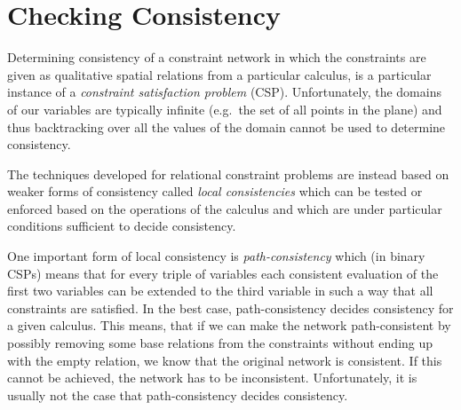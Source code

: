 \documentclass[headsepline]{scrreprt}
\theoremstyle{definition}
\newcommand{\engine}{SparQ}
\begin{document}

%



\section{Checking Consistency}
\label{sec:consistency}

Determining consistency of a constraint network in which
the constraints are given as qualitative spatial relations
from a particular calculus, is a particular instance
of a \emph{constraint satisfaction problem} (CSP).
Unfortunately, the domains of our variables are typically
infinite (e.g.\ the set of all points in the plane) and
thus backtracking over all the values of the domain cannot
be used to determine consistency.

The techniques developed for relational constraint problems
are instead based on weaker forms of consistency called
\emph{local consistencies} which can be tested or enforced
based on the operations of the calculus and which are
under particular conditions sufficient to decide
consistency.

One important form of local consistency is \emph{path-consistency} which (in binary CSPs) means that for every triple of variables each consistent evaluation of the first two variables can be extended to the third variable in such a way that all constraints are satisfied. In the best case,
path-consistency decides consistency for a given calculus. This means, that
if we can make the network path-consistent by possibly removing some
base relations from the constraints without ending up with the empty relation,
we know that the original network is consistent. If this cannot be achieved,
the network has to be inconsistent. Unfortunately, it is usually not the case
that path-consistency decides consistency.
\end{document}
